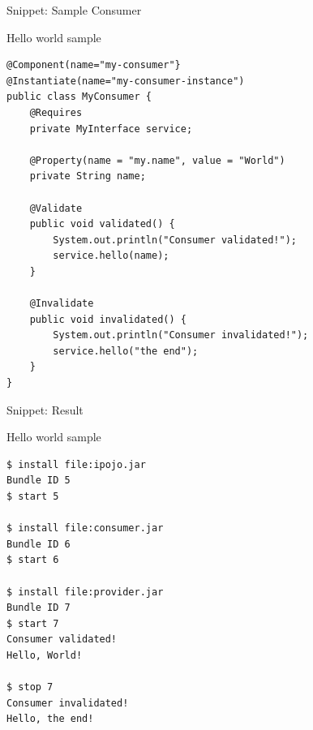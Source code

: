 \begin{frame}[fragile]{Snippet: Sample Consumer}
\begin{block}{Hello world sample}
\begin{verbatim}
@Component(name="my-consumer"}
@Instantiate(name="my-consumer-instance")
public class MyConsumer {
	@Requires
	private MyInterface service;
	
	@Property(name = "my.name", value = "World")
	private String name;
	
	@Validate
	public void validated() {
		System.out.println("Consumer validated!");
		service.hello(name);
	}
	
	@Invalidate
	public void invalidated() {
		System.out.println("Consumer invalidated!");
		service.hello("the end");
	}
}
\end{verbatim}
\end{block}
\end{frame}

\begin{frame}[fragile]{Snippet: Result}
\begin{block}{Hello world sample}
\begin{verbatim}
$ install file:ipojo.jar
Bundle ID 5
$ start 5

$ install file:consumer.jar
Bundle ID 6
$ start 6

$ install file:provider.jar
Bundle ID 7
$ start 7
Consumer validated!
Hello, World!

$ stop 7
Consumer invalidated!
Hello, the end!
\end{verbatim}
\end{block}
\end{frame}
